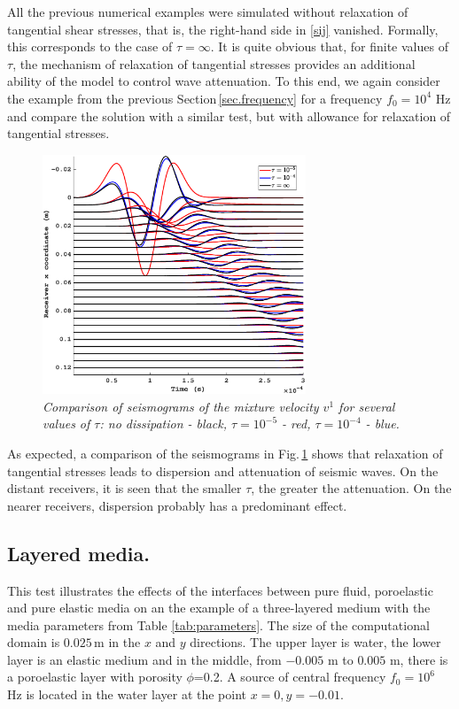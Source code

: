 \documentclass[3p,times,table]{article}
\begin{document}
All the previous numerical examples were simulated without relaxation of tangential 
shear stresses, that is, the right-hand side in \eqref{sij} vanished. Formally, 
this corresponds to the case of $\tau=\infty$. It is quite obvious that, for 
finite values of
$ \tau $, the mechanism of relaxation of tangential stresses  provides 
an additional ability of the model to 
control wave attenuation. To this end, we again 
consider the
example from the previous Section\,\ref{sec.frequency} for a frequency 
$f_0=10^{4}$ Hz and compare 
the solution with a similar test, but with allowance for  relaxation of 
tangential stresses.
\begin{figure}[t]
	\begin{center}
\includegraphics[draft=false,width=0.7\textwidth]{Figures/Compare_dissip_10_4}
	\end{center}
	\caption{{\footnotesize \it  
	Comparison of seismograms of the mixture velocity $v^1$  for several 
	values of $\tau$:
	no dissipation - black, $\tau=10^{-5}$ - red, $\tau=10^{-4}$ - blue.}}
	\label{fig: Compare_dissip}
\end{figure}
As expected, a comparison of the seismograms in Fig.\,\ref{fig: Compare_dissip} shows that relaxation of tangential stresses leads to dispersion and attenuation of seismic waves. On the distant receivers, it is seen that the smaller $\tau$, the greater the attenuation. On the nearer receivers, dispersion probably has a predominant effect.


\subsection{Layered media.}

This test illustrates the effects of the interfaces  between pure fluid, poroelastic 
and 
pure elastic media on an the example of a three-layered medium with the media 
parameters from Table 
\ref{tab:parameters}. The size of the computational domain is $0.025$\,m in the 
$ x $ and $ y $ directions. The upper layer is water, the lower layer is an
elastic 
medium and in the middle, from $-0.005$ m to $0.005$ m, there is a poroelastic 
layer with porosity $\phi$=0.2. A source of central frequency $f_0=10^{6}$ Hz 
is located in the water layer at the point $x=0, y=-0.01$. 
\end{document}

